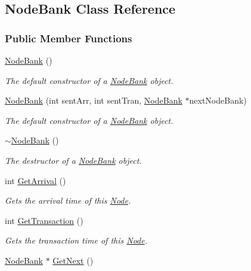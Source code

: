 \hypertarget{class_node_bank}{}\subsection{Node\+Bank Class Reference}
\label{class_node_bank}
\subsubsection*{Public Member Functions}
\begin{DoxyCompactItemize}
\item 
\hyperlink{class_node_bank_a66fc9229b9370d0c48fa3f7169b787eb}{Node\+Bank} ()
\begin{DoxyCompactList}\small\item\em The default constructor of a \hyperlink{class_node_bank}{Node\+Bank} object. \end{DoxyCompactList}\item 
\hyperlink{class_node_bank_a78d609dd3d93690a8934bbcb27c04fca}{Node\+Bank} (int sent\+Arr, int sent\+Tran, \hyperlink{class_node_bank}{Node\+Bank} $\ast$next\+Node\+Bank)
\begin{DoxyCompactList}\small\item\em The default constructor of a \hyperlink{class_node_bank}{Node\+Bank} object. \end{DoxyCompactList}\item 
\hyperlink{class_node_bank_a3fc9e55ab0fcee3e85c4e93e2ebdac95}{$\sim$\+Node\+Bank} ()
\begin{DoxyCompactList}\small\item\em The destructor of a \hyperlink{class_node_bank}{Node\+Bank} object. \end{DoxyCompactList}\item 
int \hyperlink{class_node_bank_a56d50dcdbdcb41820f0a0d608a20ea54}{Get\+Arrival} ()
\begin{DoxyCompactList}\small\item\em Gets the arrival time of this \hyperlink{class_node}{Node}. \end{DoxyCompactList}\item 
int \hyperlink{class_node_bank_a467eb1184afc83b69e391eff12e39bbb}{Get\+Transaction} ()
\begin{DoxyCompactList}\small\item\em Gets the transaction time of this \hyperlink{class_node}{Node}. \end{DoxyCompactList}\item 
\hyperlink{class_node_bank}{Node\+Bank} $\ast$ \hyperlink{class_node_bank_a5caeb5585db13f9170afb48dbb8b9b37}{Get\+Next} ()

\end{DoxyCompactItemize}
